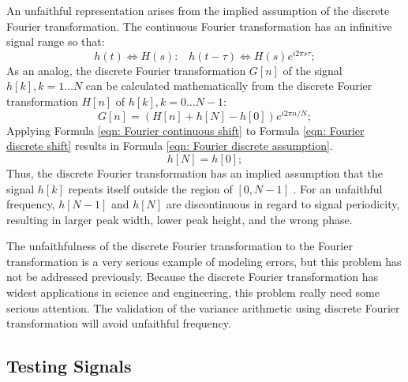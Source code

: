 \documentclass[twoside]{article}
\numberwithin{equation}{section}
\newcommand{\eqspace}{\;\;\;}
\begin{document}
An unfaithful representation arises from the implied assumption of the discrete Fourier transformation.  
The continuous Fourier transformation has an infinitive signal range so that:
\begin{equation}
\label{eqn: Fourier continuous shift}
h(t) \Leftrightarrow H(s): \eqspace h(t - \tau) \Leftrightarrow H(s) e^{i 2\pi s \tau};
\end{equation}
As an analog, the discrete Fourier transformation $G[n]$ of the signal $h[k], k = 1 \dots N$ can be calculated mathematically from the discrete Fourier transformation $H[n]$ of $h[k], k = 0\dots N-1$:
\begin{equation}
\label{eqn: Fourier discrete shift}
G[n] = (H[n] + h[N] - h[0]) e^{i 2\pi n/N};
\end{equation}
Applying Formula \eqref{eqn: Fourier continuous shift} to Formula \eqref{eqn: Fourier discrete shift} results in Formula \eqref{eqn: Fourier discrete assumption}.
\begin{equation}
\label{eqn: Fourier discrete assumption}
h[N] = h[0];
\end{equation}
Thus, the discrete Fourier transformation has an implied assumption that the signal $h[k]$ repeats itself outside the region of $[0, N-1]$ \cite{Numerical_DFT}.  
For an unfaithful frequency, $h[N-1]$ and $h[N]$ are discontinuous in regard to signal periodicity, resulting in larger peak width, lower peak height, and the wrong phase.  

The unfaithfulness of the discrete Fourier transformation to the Fourier transformation is a very serious example of modeling errors, but this problem has not be addressed previously.
Because the discrete Fourier transformation has widest applications in science and engineering, this problem really need some serious attention.
The validation of the variance arithmetic using discrete Fourier transformation will avoid unfaithful frequency.


\subsection{Testing Signals}
\end{document}
